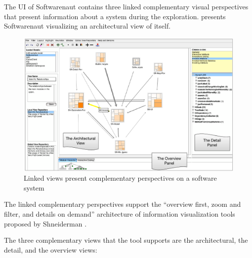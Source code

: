 \documentclass[preprint,12pt]{elsarticle}
\begin{document}
The UI of Softwarenaut contains three linked complementary visual perspectives that present information about a system during the exploration.  presents Softwarenaut visualizing an architectural view of itself. 

\begin{figure}[ht]
\begin{center}
\includegraphics[width=\linewidth]{SnautOnSnaut.pdf}
\caption{Linked views present complementary perspectives on a software system }
\end{center}
\end{figure}

The linked complementary perspectives support the ``overview first, zoom and filter, and details on demand'' architecture of information visualization tools proposed by Shneiderman \cite{shneid-eyes}. 

The three complementary views that the tool supports are the architectural, the detail, and the overview views:
\end{document}
